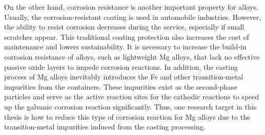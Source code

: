 On the other hand, corrosion resistance is another important property for alloys. Usually, the corrosion-resistant coating is used in automobile industries. However, the ability to resist corrosion decreases during the service, especially if small scratches appear. This traditional coating protection also increases the cost of maintenance and lowers sustainability. It is necessary to increase the build-in corrosion resistance of alloys, such as lightweight Mg alloys, that lack no effective passive oxide layers to impede corrosion reactions. In addition, the casting process of Mg alloys inevitably introduces the Fe and other transition-metal impurities from the containers. These impurities exist as the second-phase particles and serve as the active reaction sites for the cathodic reactions to speed up the galvanic corrosion reaction significantly. Thus, one research target in this thesis is how to reduce this type of corrosion reaction for Mg alloys due to the transition-metal impurities induced from the casting processing.